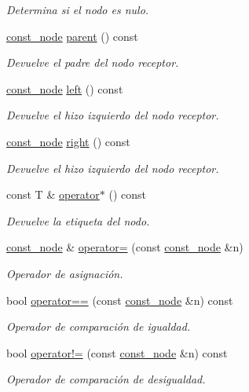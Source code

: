 \begin{DoxyCompactItemize}
\begin{DoxyCompactList}\small\item\em Determina si el nodo es nulo. \end{DoxyCompactList}\item 
\hyperlink{classbintree_1_1const__node}{const\-\_\-node} \hyperlink{classbintree_1_1const__node_ab7ea1bdf5af7b4ef38a0e1f18cd32c79}{parent} () const 
\begin{DoxyCompactList}\small\item\em Devuelve el padre del nodo receptor. \end{DoxyCompactList}\item 
\hyperlink{classbintree_1_1const__node}{const\-\_\-node} \hyperlink{classbintree_1_1const__node_ac7d405aa47245cd42854eb1b9afcd1f5}{left} () const 
\begin{DoxyCompactList}\small\item\em Devuelve el hizo izquierdo del nodo receptor. \end{DoxyCompactList}\item 
\hyperlink{classbintree_1_1const__node}{const\-\_\-node} \hyperlink{classbintree_1_1const__node_a7e86d4987f8a8b9844fcc53a9205ae30}{right} () const 
\begin{DoxyCompactList}\small\item\em Devuelve el hizo izquierdo del nodo receptor. \end{DoxyCompactList}\item 
const T \& \hyperlink{classbintree_1_1const__node_a2aaf8e239d0d763e2fc0ecb3425c1b5a}{operator$\ast$} () const 
\begin{DoxyCompactList}\small\item\em Devuelve la etiqueta del nodo. \end{DoxyCompactList}\item 
\hyperlink{classbintree_1_1const__node}{const\-\_\-node} \& \hyperlink{classbintree_1_1const__node_a15de7a0172cadeafc839d4a6c2631edb}{operator=} (const \hyperlink{classbintree_1_1const__node}{const\-\_\-node} \&n)
\begin{DoxyCompactList}\small\item\em Operador de asignación. \end{DoxyCompactList}\item 
bool \hyperlink{classbintree_1_1const__node_aed0108be5dccd63aa8accb0eb42ef5b3}{operator==} (const \hyperlink{classbintree_1_1const__node}{const\-\_\-node} \&n) const 
\begin{DoxyCompactList}\small\item\em Operador de comparación de igualdad. \end{DoxyCompactList}\item 
bool \hyperlink{classbintree_1_1const__node_a75a32333580dd26be46d4f9d5e9818d8}{operator!=} (const \hyperlink{classbintree_1_1const__node}{const\-\_\-node} \&n) const 
\begin{DoxyCompactList}\small\item\em Operador de comparación de desigualdad. \end{DoxyCompactList}\end{DoxyCompactItemize}

